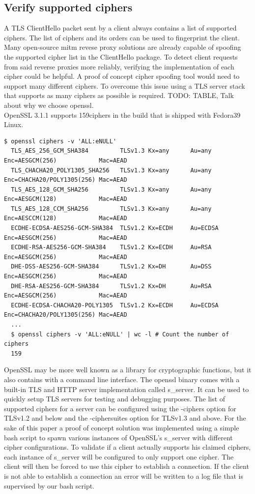 \documentclass[12pt]{scrbook}
\begin{document}
\newpage \subsection{Verify supported ciphers} A TLS ClientHello packet sent
by a client always contains a list of supported ciphers. The list of ciphers
and its orders can be used to fingerprint the client. Many open-source mitm
revese proxy solutions are already capable of spoofing the supported cipher
list in the ClientHello package. To detect client requests from said reverse
proxies more reliably, verifying the implementation of each cipher could be
helpful. A proof of concept cipher spoofing tool would need to support many
different ciphers. To overcome this issue using a TLS server stack that
supports as many ciphers as possible is required. TODO: TABLE, Talk about why
we choose openssl.\\OpenSSL 3.1.1 supports 159ciphers in the build that is
shipped with Fedora39 Linux.

\begin{lstlisting}[breaklines=true,basicstyle=\tiny]
  $ openssl ciphers -v 'ALL:eNULL'
  TLS_AES_256_GCM_SHA384         TLSv1.3 Kx=any      Au=any   Enc=AESGCM(256)            Mac=AEAD
  TLS_CHACHA20_POLY1305_SHA256   TLSv1.3 Kx=any      Au=any   Enc=CHACHA20/POLY1305(256) Mac=AEAD
  TLS_AES_128_GCM_SHA256         TLSv1.3 Kx=any      Au=any   Enc=AESGCM(128)            Mac=AEAD
  TLS_AES_128_CCM_SHA256         TLSv1.3 Kx=any      Au=any   Enc=AESCCM(128)            Mac=AEAD
  ECDHE-ECDSA-AES256-GCM-SHA384  TLSv1.2 Kx=ECDH     Au=ECDSA Enc=AESGCM(256)            Mac=AEAD
  ECDHE-RSA-AES256-GCM-SHA384    TLSv1.2 Kx=ECDH     Au=RSA   Enc=AESGCM(256)            Mac=AEAD
  DHE-DSS-AES256-GCM-SHA384      TLSv1.2 Kx=DH       Au=DSS   Enc=AESGCM(256)            Mac=AEAD
  DHE-RSA-AES256-GCM-SHA384      TLSv1.2 Kx=DH       Au=RSA   Enc=AESGCM(256)            Mac=AEAD
  ECDHE-ECDSA-CHACHA20-POLY1305  TLSv1.2 Kx=ECDH     Au=ECDSA Enc=CHACHA20/POLY1305(256) Mac=AEAD
  ...
  $ openssl ciphers -v 'ALL:eNULL' | wc -l # Count the number of ciphers
  159
\end{lstlisting}

OpenSSL may be more well known as a library for cryptographic functions, but it
also contains with a command line interface. The openssl binary comes with a
built-in TLS and HTTP server implementation called s\_server. It can be used to
quickly setup TLS servers for testing and debugging purposes. The list of
supported ciphers for a server can be configured using the -ciphers option for
TLSv1.2 and below and the -ciphersuites option for TLSv1.3 and above. For the
sake of this paper a proof of concept solution was implemented using a simple
bash script to spawn various instances of OpenSSL's s\_server with different
cipher configurations. To validate if a client actually supports his claimed
ciphers, each instance of s\_server will be configured to only support one
cipher. The client will then be forced to use this cipher to establish a
connection. If the client is not able to establish a connection an error will be
written to a log file that is supervised by our bash script.
\end{document}
